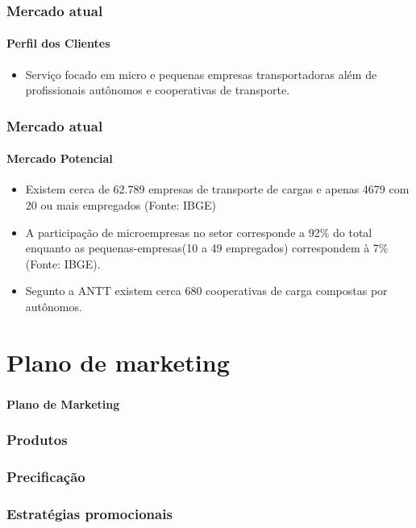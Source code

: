 \documentclass{beamer}
\begin{document}
\begin{frame}
  \frametitle{Mercado atual}
  
  \framesubtitle{Perfil dos Clientes}
      \begin{itemize}
      \item Serviço focado em micro e pequenas empresas transportadoras além de profissionais autônomos e cooperativas de transporte.
      \end{itemize}
\end{frame}

\begin{frame}
  \frametitle{Mercado atual}
  \framesubtitle{Mercado Potencial}
      \begin{itemize}
      \item Existem cerca de 62.789 empresas de transporte de cargas e apenas 4679 com 20 ou mais empregados (Fonte: IBGE)
      \item A participação de microempresas no setor corresponde a 92\% do total enquanto as pequenas-empresas(10 a 49 empregados) correspondem à 7\%(Fonte: IBGE).
      \item Segunto a ANTT existem cerca 680 cooperativas de carga compostas por autônomos.
      \end{itemize}
\end{frame}
\section{Plano de marketing}

\begin{frame}
  \frametitle{}
  \framesubtitle{}

  \begin{center}
    {\huge\textbf{Plano de Marketing}}
  \end{center}
\end{frame}

\begin{frame}
  \frametitle{Produtos}
  \framesubtitle{}

\end{frame}

\begin{frame}
  \frametitle{Precificação}
  \framesubtitle{}

\end{frame}

\begin{frame}
  \frametitle{Estratégias promocionais}
  \framesubtitle{}

\end{frame}
\end{document}
